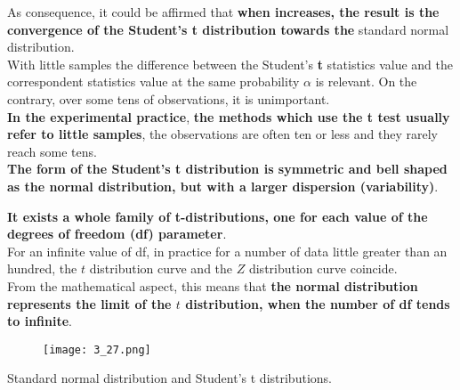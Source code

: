 \begin{frame}
  \vspace*{.25cm}
  As consequence, it could be affirmed that \textbf{when  increases, the result is the convergence of the Student's \textbf{t} distribution towards the } standard normal distribution.\\
  \vspace*{.25cm}
  With little samples the difference between the Student's \textbf{t} statistics value and the correspondent  statistics value at the same probability {\boldmath $ \alpha $} is relevant. On the contrary, over some tens of observations, it is unimportant.\\
  \vspace*{.25cm}
  \textbf{In the experimental practice}, \textbf{the methods which use the t test usually refer to little samples}, the observations are often ten or less and they rarely reach some tens.\\
  \vspace*{.25cm}
  \textbf{The form of the Student's t distribution is symmetric and bell shaped as the normal distribution, but with a larger dispersion (variability)}.
\end{frame}

\begin{frame}
  \vspace*{.5cm}
  \textbf{It exists a whole family of t-distributions, one for each value of the degrees of freedom (df) parameter}.\\
  \vspace*{.5cm}
  For an infinite value of df, in practice for a number of data little greater than an hundred, the {\boldmath $ t $} distribution curve and the {\boldmath $ Z $} distribution curve coincide.\\
  \vspace*{.5cm}
  From the mathematical aspect, this means that \textbf{the normal distribution represents the limit of the {\boldmath $ t $} distribution, when the number of df tends to infinite}.
\end{frame}

\begin{frame}
  \begin{figure}
    \texttt{[image: 3\_27.png]}
  \end{figure}
  \hspace*{1cm}Standard normal distribution and Student's t distributions.
\end{frame}

